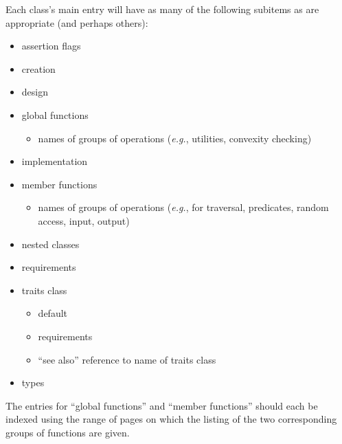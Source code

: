 \documentclass{article}
\begin{document}
\begin{description}
       Each class's main entry will have as many of the following subitems as
       are appropriate (and perhaps others):
           \begin{itemize}
              \item assertion flags
              \item creation
              \item design
              \item global functions 
                    \begin{itemize}
                       \item names of groups of operations  ({\em e.g.},
                             utilities, convexity checking)
                    \end{itemize}
              \item implementation
              \item member functions 
                    \begin{itemize}
                       \item names of groups of operations ({\em e.g.},
                             for  traversal,
                             predicates, random access, input, output)
                    \end{itemize}
              \item nested classes
              \item requirements
              \item traits class
                    \begin{itemize}
                       \item default
                       \item requirements
                       \item ``see also'' reference to name of traits class
                    \end{itemize}
             \item types
           \end{itemize}
      The entries for ``global functions'' and ``member functions'' should 
      each be indexed using the range of pages on which the listing of the two 
      corresponding groups of functions are given.


\end{description}
\end{document}
